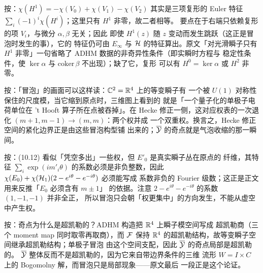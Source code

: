 \begin{yizhu}[含糊点拨]
按：$\chi(H^1)=-\chi(V_0)+\chi(V_1)-\chi(V_2)$ 其实是三项复形的
Euler 特征 $\sum_i(-1)^i\chi(H^i)$；这里只有 $H^1$ 非零，故二者相等。
要点在于右端只依赖复形的项 $V_i$，与微分 $\alpha,\beta$ 无关；因此
即使 $H^1(z)$ 随 $z$ 变动而发生跳跃（这正是冒泡时发生的事），它的
特征仍可由 $E_\infty$ 与 ${{\EUH}}$ 的特征算出。原文「对光滑瞬子只有
$H^1$ 非零」一句省略了 ADHM 数据的非奇异性条件（即实瞬时方程与
稳定性条件，使 $\ker\alpha$ 与 $\mathrm{coker}\,\beta$ 不出现）；缺了它，复形
可以有 $H^0=\ker\alpha$ 或 $H^2$ 非零。
\end{yizhu}

\begin{yizhu}[物理图像]
按：「冒泡」的画面可以这样读：$\Bbb{C}^2=\Bbb{R}^4$ 上的等变瞬子有
一个被 $U(1)$ 对称性保住的尺度模，当它缩到原点时，三维图上看到的
就是「一个量子化的单极子电荷单位在 't Hooft 算子所在点被吞掉」。在
Hecke 修正一侧，这对应权表的一次退化 $(m+1,m-1)\to(m,m)$：两个权并成
一个双重权。换言之，Hecke 修正空间的紧化边界正是由这些冒泡构型铺
出来的；$\bar {{\EUY}}$ 的奇点就是气泡收缩的那一瞬间。
\end{yizhu}

\begin{yizhu}[易错点]
按：(10.12) 看似「凭空多出」一些权，但 $E'_0$ 是真实瞬子丛在原点的
纤维，其特征 $\sum_i\exp(im'_i\theta)$ 的系数必须是非负整数，因此
$\chi(E_0)+\chi({{\EUH}}_1)(2-e^{i\theta}-e^{-i\theta})$ 必须能写成
系数非负的 Fourier 级数；这正是正文用来反推「$E_0$ 必须含有 $m\pm1$」
的依据。注意 $2-e^{i\theta}-e^{-i\theta}$ 的系数 $(1,-1,-1)$ 并非全正，
所以冒泡只会朝「权更集中」的方向发生，不能从虚空中产生权。
\end{yizhu}

\begin{yizhu}[物理图像]
按：奇点为什么是超凯勒的？ADHM 构造把 $\Bbb{R}^4$ 上瞬子模空间写成
超凯勒商（三个 moment map 同时取零再取商），而 ${\EUF}$ 保持
$\Bbb{R}^4$ 的超凯勒结构，故等变瞬子空间继承超凯勒结构；单极子冒泡
由这个空间支配，因此 $\bar {{\EUY}}$ 的奇点局部是超凯勒的。
$\bar {{\EUY}}$ 整体反而不是超凯勒的，因为它来自带边界条件的三维
流形 $W=I\times C$ 上的 Bogomolny 解，而冒泡只是局部现象——原文最后
一段正是这个论证。
\end{yizhu}

